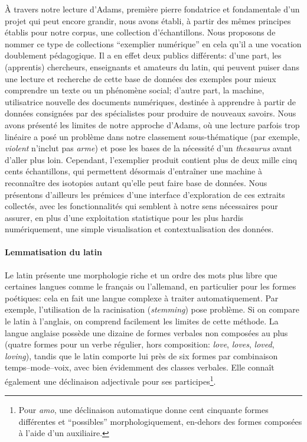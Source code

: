 À travers notre lecture d'Adams, première pierre fondatrice et fondamentale d'un projet qui peut encore grandir, nous avons établi, à partir des mêmes principes établis pour notre corpus, une collection d'échantillons. Nous proposons de nommer ce type de collections \enquote{exemplier numérique} en cela qu'il a une vocation doublement pédagogique. Il a en effet deux publics différents: d'une part, les (apprentis) chercheurs, enseignants et amateurs du latin, qui peuvent puiser dans une lecture et recherche de cette base de données des exemples pour mieux comprendre un texte ou un phénomène social; d'autre part, la machine, utilisatrice nouvelle des documents numériques, destinée à apprendre à partir de données consignées par des spécialistes pour produire de nouveaux savoirs. Nous avons présenté les limites de notre approche d'Adams, où une lecture parfois trop linéaire a posé un problème dans notre classement sous-thématique (par exemple, \textit{violent} n'inclut pas \textit{arme}) et pose les bases de la nécessité d'un \textit{thesaurus} avant d'aller plus loin. Cependant, l'exemplier produit contient plus de deux mille cinq cents échantillons, qui permettent désormais d'entraîner une machine à reconnaître des isotopies autant qu'elle peut faire base de données. Nous présentons d'ailleurs les prémices d'une interface d'exploration de ces extraits collectés, avec les fonctionnalités qui semblent à notre sens nécessaires pour assurer, en plus d'une exploitation statistique pour les plus hardis numériquement, une simple visualisation et contextualisation des données.

\paragraph{Lemmatisation du latin}

Le latin présente une morphologie riche et un ordre des mots plus libre que certaines langues comme le français ou l'allemand, en particulier pour les formes poétiques: cela en fait une langue complexe à traiter automatiquement. Par exemple, l'utilisation de la racinisation (\textit{stemming}) pose problème. Si on compare le latin à l'anglais, on comprend facilement les limites de cette méthode. La langue anglaise possède une dizaine de formes verbales non composées au plus (quatre formes pour un verbe régulier, hors composition: \textit{love}, \textit{loves}, \textit{loved}, \textit{loving}), tandis que le latin comporte lui près de six formes par combinaison temps--mode--voix, avec bien évidemment des classes verbales. Elle connaît également une déclinaison adjectivale pour ses participes\footnote{Pour \textit{amo}, une déclinaison automatique donne cent cinquante formes différentes et \enquote{possibles} morphologiquement, en-dehors des formes composées à l'aide d'un auxiliaire.}.

